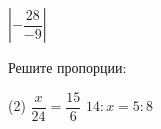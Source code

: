 \begin{class}[number=3-4]
\begin{listofex}[resume]
\begin{tasks}
			\task \(  \left|-\dfrac{28}{-9}\right| \)
		\end{tasks}
		\item Решите пропорции:
		\begin{tasks}(2)
			\task \( \dfrac{x}{24}=\dfrac{15}{6} \)
			\task \( 14:x=5:8\)
		\end{tasks}
	\end{listofex}
\end{class}


